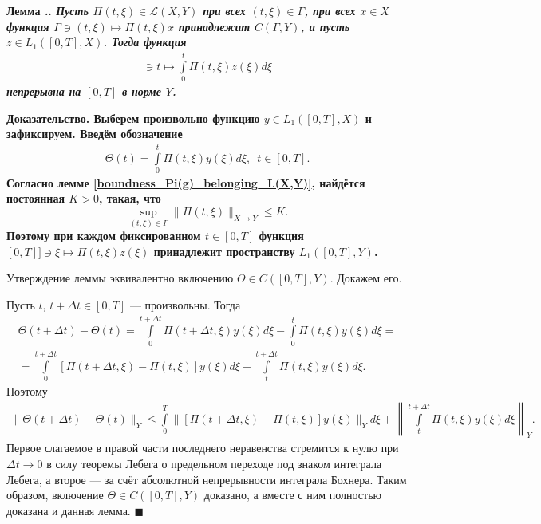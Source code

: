 \documentclass{report}
\newcounter{lem}[section]
\renewcommand{\thelem}{\thesection.\arabic{lem}}
\newenvironment{Lemma}{\par\refstepcounter{lem}\bf Лемма \thelem. \it}{\rm\par}
\newenvironment{Proof}{\par\noindent\bf Доказательство.\rm}{ $\blacksquare$\par}
\begin{document}
\begin{Lemma}\label{parametric_integral_1}
Пусть $\Pi(t,\xi)\in\mathcal{L}(X,Y)$ при всех $(t,\xi)\in\Gamma$, при всех $x\in X$ функция $\Gamma\ni(t,\xi)\mapsto\Pi(t,\xi)x$ принадлежит $C(\Gamma,Y)$, и пусть $z\in L_1([0,T],X)$.
Тогда функция
\begin{gather*}
[0,T]\ni t\mapsto\int\limits_0^t\Pi(t,\xi)z(\xi)d\xi
\end{gather*}
непрерывна на $[0,T]$ в норме $Y$.
\end{Lemma}
\begin{Proof}
Выберем произвольно функцию $y\in L_1([0,T],X)$ и зафиксируем. Введём обозначение
\begin{gather*}
\Theta(t)=\int\limits_0^t\Pi(t,\xi)y(\xi)d\xi,\,\,\,t\in[0,T].
\end{gather*}
Согласно лемме \ref{boundness_Pi(g)_belonging_L(X,Y)}, найдётся постоянная $K>0$, такая, что
$$
\sup\limits_{(t,\xi)\in\Gamma}\|\Pi(t,\xi)\|_{X\to Y}\leqslant K.
$$
Поэтому при каждом фиксированном $t\in[0,T]$ функция $[0,T]]\ni\xi\mapsto\Pi(t,\xi)z(\xi)$ принадлежит пространству $L_1([0,T],Y)$.


Утверждение леммы эквивалентно включению $\Theta\in C([0,T],Y)$. Докажем его.

Пусть $t$, $t+\Delta t\in[0,T]$ --- произвольны. Тогда
\begin{gather*}
\Theta(t+\Delta t)-\Theta(t)=\int\limits_0^{t+\Delta t}\Pi(t+\Delta t,\xi)y(\xi)d\xi-\int\limits_0^t\Pi(t,\xi)y(\xi)d\xi=\\
=\int\limits_0^{t+\Delta t}[\Pi(t+\Delta t,\xi)-\Pi(t,\xi)]y(\xi)d\xi+\int\limits_t^{t+\Delta t}\Pi(t,\xi)y(\xi)d\xi.
\end{gather*}
Поэтому
\begin{gather*}
\|\Theta(t+\Delta t)-\Theta(t)\|_Y\leqslant\int\limits_0^T\|[\Pi(t+\Delta t,\xi)-\Pi(t,\xi)]y(\xi)\|_Yd\xi+\left\|\int\limits_t^{t+\Delta t}\Pi(t,\xi)y(\xi)d\xi\right\|_Y.
\end{gather*}
Первое слагаемое в правой части последнего неравенства стремится к нулю при $\Delta t\to0$ в силу теоремы Лебега о предельном переходе под знаком интеграла Лебега, а второе --- за счёт
абсолютной непрерывности интеграла Бохнера. Таким образом, включение $\Theta\in C([0,T],Y)$ доказано, а вместе с ним полностью доказана и данная лемма.
\end{Proof}
\end{document}
